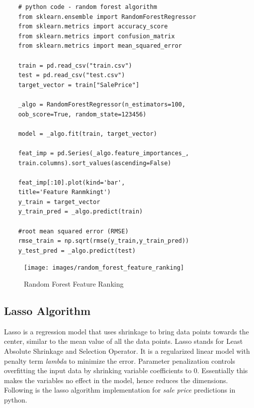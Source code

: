 \documentclass[sigconf]{acmart}
\begin{document}
	\begin{verbatim}		
	# python code - random forest algorithm
	from sklearn.ensemble import RandomForestRegressor
	from sklearn.metrics import accuracy_score
	from sklearn.metrics import confusion_matrix
	from sklearn.metrics import mean_squared_error
	
	train = pd.read_csv("train.csv")
	test = pd.read_csv("test.csv")
	target_vector = train["SalePrice"]
	
	_algo = RandomForestRegressor(n_estimators=100, 
	oob_score=True, random_state=123456)
	
	model = _algo.fit(train, target_vector)  
	
	feat_imp = pd.Series(_algo.feature_importances_, 
	train.columns).sort_values(ascending=False)
	
	feat_imp[:10].plot(kind='bar', 
	title='Feature Ranmkingt')		
	y_train = target_vector
	y_train_pred = _algo.predict(train)
	
	#root mean squared error (RMSE)
	rmse_train = np.sqrt(rmse(y_train,y_train_pred))			
	y_test_pred = _algo.predict(test)		
	\end{verbatim}
	
	
	\begin{figure}[H]
		\centering
		\texttt{[image: images/random\_forest\_feature\_ranking]}	
		\caption{Random Forest Feature Ranking} \label{fig:random_feature_ranking} 
	\end{figure}
	
	\subsection{Lasso Algorithm}
	Lasso is a regression model that uses shrinkage to bring data points towards the center, similar to the mean value of all the data points. Lasso stands for Least Absolute Shrinkage and Selection Operator. It is a regularized linear model with penalty term {\em lambda} to minimize the error. Parameter penalization controls overfitting the input data by shrinking variable coefficients to 0. Essentially this makes the variables no effect in the model, hence reduces the dimensions. Following is the lasso algorithm implementation for {\em sale price} predictions in python.
		
\end{document}
